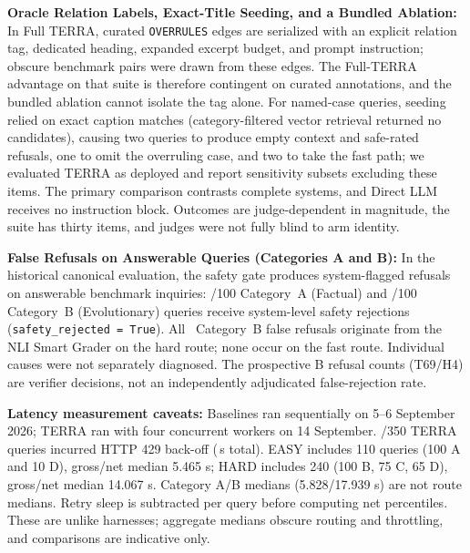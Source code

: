 \item \textbf{Oracle Relation Labels, Exact-Title Seeding, and a Bundled Ablation:} In Full TERRA, curated \texttt{OVERRULES} edges are serialized with an explicit relation tag, dedicated heading, expanded excerpt budget, and prompt instruction; obscure benchmark pairs were drawn from these edges. The Full-TERRA advantage on that suite is therefore contingent on curated annotations, and the bundled ablation cannot isolate the tag alone. For named-case queries, seeding relied on exact caption matches (category-filtered vector retrieval returned no candidates), causing two queries to produce empty context and safe-rated refusals, one to omit the overruling case, and two to take the fast path; we evaluated TERRA as deployed and report sensitivity subsets excluding these items. The primary comparison contrasts complete systems, and Direct LLM receives no instruction block. Outcomes are judge-dependent in magnitude, the suite has thirty items, and judges were not fully blind to arm identity.

\item \label{item:falserefusal}\textbf{False Refusals on Answerable Queries (Categories A and B):}
In the historical canonical evaluation, the safety gate produces system-flagged refusals on answerable benchmark inquiries: \TerraCatAFalseRefusals/100 Category~A (Factual) and \TerraCatBFalseRefusals/100 Category~B (Evolutionary) queries receive system-level safety rejections (\texttt{safety\_rejected = True}). All \TerraCatBFalseRefusals\ Category~B false refusals originate from the NLI Smart Grader on the hard route; none occur on the fast route. Individual causes were not separately diagnosed. The prospective B refusal counts (T69/H4) are verifier decisions, not an independently adjudicated false-rejection rate.

\item \textbf{Latency measurement caveats:} Baselines ran sequentially on 5--6 September 2026; TERRA ran with four concurrent workers on 14 September. \TerraThrottledRows/350 TERRA queries incurred HTTP 429 back-off (\TerraThrottleSleepSeconds\,s total). EASY includes 110 queries (100 A and 10 D), gross/net median 5.465 s; HARD includes 240 (100 B, 75 C, 65 D), gross/net median 14.067 s. Category A/B medians (5.828/17.939 s) are not route medians. Retry sleep is subtracted per query before computing net percentiles. These are unlike harnesses; aggregate medians obscure routing and throttling, and comparisons are indicative only.

